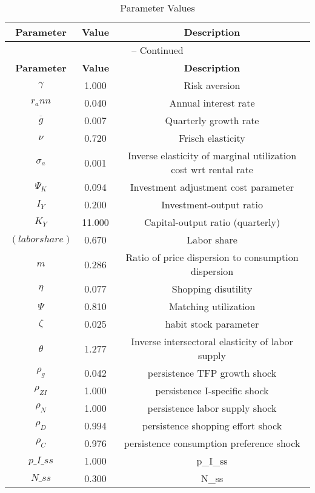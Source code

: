 \begin{center}
\begin{longtable}{ccc}
\caption{Parameter Values}\\%
\toprule%
\multicolumn{1}{c}{\textbf{Parameter}} &
\multicolumn{1}{c}{\textbf{Value}} &
 \multicolumn{1}{c}{\textbf{Description}}\\%
\midrule%
\endfirsthead
\multicolumn{3}{c}{{\tablename} \thetable{} -- Continued}\\%
\midrule%
\multicolumn{1}{c}{\textbf{Parameter}} &
\multicolumn{1}{c}{\textbf{Value}} &
  \multicolumn{1}{c}{\textbf{Description}}\\%
\midrule%
\endhead
${\gamma}$ 	 & 	 1.000 	 & 	 Risk aversion\\
${r_ann}$ 	 & 	 0.040 	 & 	 Annual interest rate\\
${\overline{g}}$ 	 & 	 0.007 	 & 	 Quarterly growth rate\\
$\nu$ 	 & 	 0.720 	 & 	 Frisch elasticity\\
${\sigma_a}$ 	 & 	 0.001 	 & 	 Inverse elasticity of marginal utilization cost wrt rental rate\\
${\Psi_K}$ 	 & 	 0.094 	 & 	 Investment adjustment cost parameter\\
${I_Y}$ 	 & 	 0.200 	 & 	 Investment-output ratio\\
${K_Y}$ 	 & 	 11.000 	 & 	 Capital-output ratio (quarterly)\\
$(labor share)$ 	 & 	 0.670 	 & 	 Labor share\\
${m}$ 	 & 	 0.286 	 & 	 Ratio of price dispersion to consumption dispersion\\
${\eta}$ 	 & 	 0.077 	 & 	 Shopping disutility\\
${\Psi}$ 	 & 	 0.810 	 & 	 Matching utilization\\
${\zeta}$ 	 & 	 0.025 	 & 	 habit stock parameter\\
${\theta}$ 	 & 	 1.277 	 & 	 Inverse intersectoral elasticity of labor supply\\
${\rho_g}$ 	 & 	 0.042 	 & 	 persistence TFP growth shock\\
${\rho_{ZI}}$ 	 & 	 1.000 	 & 	 persistence I-specific shock\\
${\rho_N}$ 	 & 	 1.000 	 & 	 persistence labor supply shock\\
${\rho_D}$ 	 & 	 0.994 	 & 	 persistence shopping effort shock\\
${\rho_C}$ 	 & 	 0.976 	 & 	 persistence consumption preference shock\\
$p\_I\_ss$ 	 & 	 1.000 	 & 	 p\_I\_ss\\
$N\_ss$ 	 & 	 0.300 	 & 	 N\_ss\\
\bottomrule%
\end{longtable}
\end{center}

